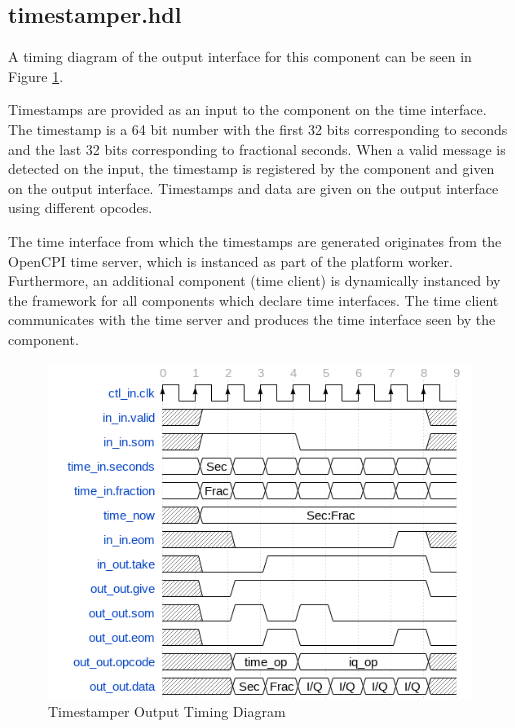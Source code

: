 \documentclass{article}
\def\comp{timestamper}
\begin{document}
\subsection*{\comp.hdl}
\begin{flushleft}
	A timing diagram of the output interface for this component can be seen in Figure \ref{fig:timestamper_timing_diagram}.\par\bigskip
	\noindent Timestamps are provided as an input to the component on the time interface. The timestamp is a 64 bit number with the first 32 bits corresponding to seconds and the last 32 bits corresponding to fractional seconds. When a valid message is detected on the input, the timestamp is registered by the component and given on the output interface. Timestamps and data are given on the output interface using different opcodes.\par\bigskip
	The time interface from which the timestamps are generated originates from the OpenCPI time server, which is instanced as part of the platform worker. Furthermore, an additional component (time client) is dynamically instanced by the framework for all components which declare time interfaces. The time client communicates with the time server and produces the time interface seen by the component.
\end{flushleft}
\begin{figure}[p]
	\centering
	\includegraphics[scale=0.6]{timestamper_timing_diagram}
	\caption{Timestamper Output Timing Diagram}
	\label{fig:timestamper_timing_diagram}
\end{figure}
\pagebreak
\end{document}
